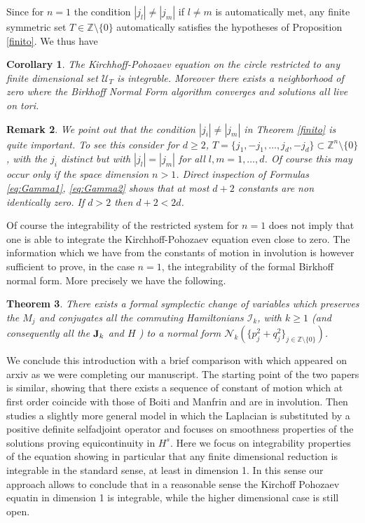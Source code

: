 \documentclass[reqno,11pt]{amsart}
\theoremstyle{plain}
\numberwithin{equation}{section}
\newtheorem{theorem}{Theorem}[section]
\newtheorem{corollary}[theorem]{Corollary}
\newtheorem{remark}[theorem]{Remark}
\newcommand{\Z}{\mathbb{Z}}
\newcommand{\I}{{\texttt{\bf J}}}
\newcommand{\cI}{{\mathcal I}}
\begin{document}
Since for $n=1$ the condition  $|j_l| \neq | j_m|$ if $l\neq m$ is automatically met, any finite symmetric  set $T\in \Z\setminus\{0\}$ automatically satisfies the hypotheses of Proposition \ref{finito}. We thus have
\begin{corollary}\label{uffa}
	The Kirchhoff-Pohozaev equation on the circle restricted to any finite dimensional set $\mathscr{U}_T$ is integrable. Moreover there exists a neighborhood of zero where the Birkhoff Normal Form algorithm converges and solutions all live on tori.
\end{corollary}
\begin{remark}
	We point out that the condition $|j_i|\neq |j_m|$ in Theorem \ref{finito} is quite important. To see this consider  for $d\geq 2$,
	$T= \{j_1,-j_1,\dots, j_d,-j_d\}\subset  \Z^n\setminus\{0\}$, with  the $j_i$ distinct but with $|j_l| = | j_m|$ for all $l,m=1,\dots,d$. Of course this may occur only if the space dimension $n>1$.  Direct inspection of Formulas \eqref{eq:Gamma1}, \eqref{eq:Gamma2} shows that at most $d+2$ constants are non identically zero. If $d>2$ then $d+2<2d$.
\end{remark}

\smallskip

Of course the integrability of the restricted system  for $n=1$ does not imply that one is able to integrate the Kirchhoff-Pohozaev equation even close to zero.
The information which we have from the constants of motion in involution is however sufficient to prove, in the case $n=1$, the integrability of the formal Birkhoff normal form. More precisely we have the following.

\begin{theorem}\label{formal-birk}
	There exists a formal symplectic change of variables which preserves the $M_j$ and conjugates all the commuting Hamiltonians $\cI_k$, with $k\geq 1$ (and consequently all the $\I_k$ and $H$ )  to a normal form  $\mathcal N_k(\{p_j^2+q_j^2\}_{j\in \Z\setminus\{0\}})$.
\end{theorem}
We conclude this introduction with a brief comparison with \cite{campos} which appeared on arxiv as we were completing our manuscript. The starting point of the two papers is  similar,  showing that there exists a sequence of constant of motion which at first order coincide with those of Boiti and Manfrin and are in involution. Then \cite{campos}  studies  a slightly more general model in which the Laplacian is substituted by a positive definite selfadjoint operator and focuses  on smoothness properties of the solutions proving equicontinuity in $H^s$. Here we focus on  integrability properties of the equation showing in particular that any finite dimensional reduction is integrable in the standard sense, at least in dimension 1. In this sense our approach allows to conclude that in a reasonable sense the Kirchoff Pohozaev equatin in dimension 1 is integrable, while the higher dimensional case is still open. 
\end{document}
